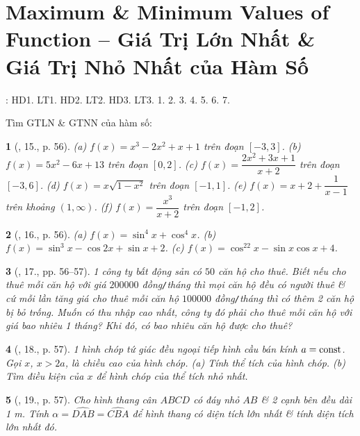 \documentclass{article}
\newtheorem{baitoan}{}
\begin{document}

\section{Maximum \& Minimum Values of Function -- Giá Trị Lớn Nhất \& Giá Trị Nhỏ Nhất của Hàm Số}
\cite[Chap. I, \S2, pp. 15--20]{SGK_Toan_12_CD_tap_1}: HD1. LT1. HD2. LT2. HD3. LT3. 1. 2. 3. 4. 5. 6. 7.

Tìm GTLN \& GTNN của hàm số:

\begin{baitoan}[\cite{TLCT_BT_dai_so_giai_tich_11}, 15., p. 56]
	(a) $f(x) = x^3 - 2x^2 + x + 1$ trên đoạn $[-3,3]$. (b) $f(x) = 5x^2 - 6x + 13$  trên đoạn $[0,2]$. (c) $f(x) = \dfrac{2x^2 + 3x + 1}{x + 2}$ trên đoạn $[-3,6]$. (d) $f(x) = x\sqrt{1 - x^2}$ trên đoạn $[-1,1]$. (e) $f(x) = x + 2 + \dfrac{1}{x - 1}$  trên khoảng $(1,\infty)$. (f) $f(x) = \dfrac{x^3}{x + 2}$  trên đoạn $[-1,2]$.
\end{baitoan}

\begin{baitoan}[\cite{TLCT_BT_dai_so_giai_tich_11}, 16., p. 56]
	(a) $f(x) = \sin^4x + \cos^4x$. (b) $f(x) = \sin^3x - \cos2x + \sin x + 2$. (c) $f(x) = \cos^22x - \sin x\cos x + 4$.
\end{baitoan}

\begin{baitoan}[\cite{TLCT_BT_dai_so_giai_tich_11}, 17., pp. 56--57]
	1 công ty bất động sản có $50$ căn hộ cho thuê. Biết nếu cho thuê mỗi căn hộ với giá $200000$ đồng{\tt/}tháng thì mọi căn hộ đều có người thuê \& cứ mỗi lần tăng giá cho thuê mỗi căn hộ $100000$ đồng{\tt/}tháng thì có thêm 2 căn hộ bị bỏ trống. Muốn có thu nhập cao nhất, công ty đó phải cho thuê mỗi căn hộ với giá bao nhiêu 1 tháng? Khi đó, có bao nhiêu căn hộ được cho thuê?
\end{baitoan}

\begin{baitoan}[\cite{TLCT_BT_dai_so_giai_tich_11}, 18., p. 57]
	1 hình chóp tứ giác đều ngoại tiếp hình cầu bán kính $a = {\rm const}$. Gọi $x$, $x > 2a$, là chiều cao của hình chóp. (a) Tính thể tích của hình chóp. (b) Tìm điều kiện của $x$ để hình chóp của thể tích nhỏ nhất.
\end{baitoan}

\begin{baitoan}[\cite{TLCT_BT_dai_so_giai_tich_11}, 19., p. 57]
	Cho hình thang cân $ABCD$ có đáy nhỏ $AB$ \& 2 cạnh bên đều dài {\rm1 m}. Tính $\alpha = \widehat{DAB} = \widehat{CBA}$ để hình thang có diện tích lớn nhất \& tính diện tích lớn nhất đó.
\end{baitoan}
\end{document}
